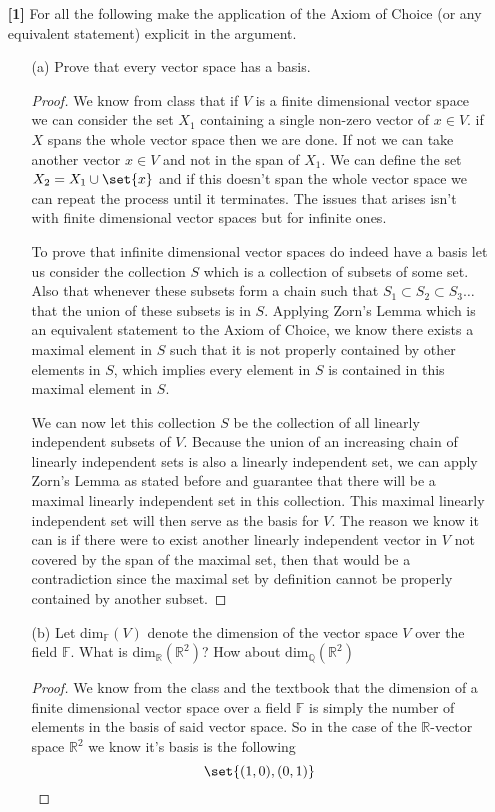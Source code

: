 \documentclass[12pt]{article}
\DeclarePairedDelimiter\set\{\}
\newcommand      {\Qm}         {{\mathbb Q}}
\newcommand      {\Rm}         {{\mathbb R}}
\newcommand      {\Fm}          {{\mathbb F}}
\begin{document}
\begin{itemize}
\begin{itemize}
\begin{proof}
            Thus we have it that the differntial map as defined in part b is neither injective nor surjective. 

        \end{proof}
        
        
    \end{itemize}    


    \item[\textbf{[1]}] For all the following make the application of the Axiom of Choice (or any equivalent statement) explicit in the argument.
    \begin{itemize}
        \item[(a)] Prove that every vector space has a basis.
        \begin{proof}
            We know from class that if $V$ is a finite dimensional vector space we can consider the set $X_1$  containing a single non-zero vector of $x\in V$. if $X$ spans the whole vector space then we are done. If not we can take another vector $x\in V$ and not in the span of $X_1$. We can define the set $X_2 = X_1 \cup \set{x} $ and if this doesn't span the whole vector space we can repeat the process until it terminates. The issues that arises isn't with finite dimensional vector spaces but for infinite ones.

            To prove that infinite dimensional vector spaces do indeed have a basis let us consider the collection $S$ which is a collection of subsets of some set. Also that whenever these subsets form a chain such that $S_1 \subset S_2 \subset S_3 \dots$ that the union of these subsets is in $S$. Applying Zorn's Lemma which is an equivalent statement to the Axiom of Choice, we know there exists a maximal element in $S$ such that it is not properly contained by other elements in $S$, which implies every element in $S$ is contained in this maximal element in $S$. 

            We can now let this collection $S$ be the collection of all linearly independent subsets of $V$. Because the union of an increasing chain of linearly independent sets is also a linearly independent set, we can apply Zorn's Lemma as stated before and guarantee that there will be a maximal linearly independent set in this collection. This maximal linearly independent set will then serve as the basis for $V$. The reason we know it can is if there were to exist another linearly independent vector in $V$ not covered by the span of the maximal set, then that would be a contradiction since the maximal set by definition cannot be properly contained by another subset.
        \end{proof}
        \item[(b)] Let dim$_\Fm (V)$ denote the dimension of the vector space $V$ over the field $\Fm$. What is  dim$_\Rm(\Rm^2)$? How about dim$_\Qm(\Rm^2)$
        \begin{proof}
            We know from the class and the textbook that the dimension of a finite dimensional vector space over a field $\Fm$ is simply the number of elements in the basis of said vector space. So in the case of the $\Rm$-vector space $\Rm^2$ we know it's basis is the following \[\set{(1,0),(0,1)}\]


\end{proof}
\end{itemize}
\end{itemize}
\end{document}
